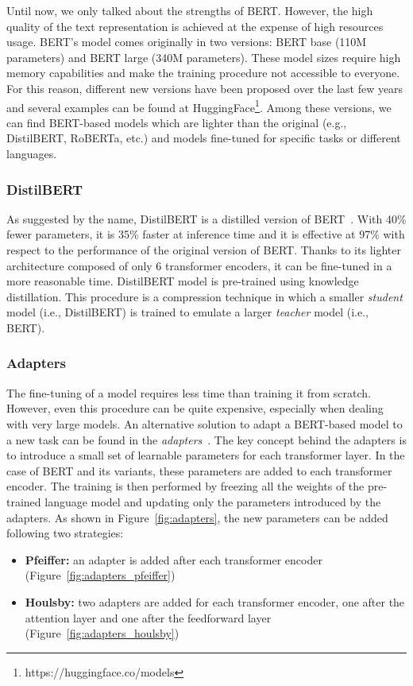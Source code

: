 Until now, we only talked about the strengths of BERT. However, the high quality of the text representation is achieved at the expense of high resources usage. BERT's model comes originally in two versions: BERT base (110M parameters) and BERT large (340M parameters). These model sizes require high memory capabilities and make the training procedure not accessible to everyone. For this reason, different new versions have been proposed over the last few years and several examples can be found at HuggingFace\footnote{https://huggingface.co/models}. Among these versions, we can find BERT-based models which are lighter than the original (e.g., DistilBERT, RoBERTa, etc.) and models fine-tuned for specific tasks or different languages.



\subsubsection{DistilBERT}
As suggested by the name, DistilBERT is a distilled version of BERT~\cite{distilbert}. With 40\% fewer parameters, it is 35\% faster at inference time and it is effective at 97\% with respect to the performance of the original version of BERT. Thanks to its lighter architecture composed of only 6 transformer encoders, it can be fine-tuned in a more reasonable time. DistilBERT model is pre-trained using knowledge distillation. This procedure is a compression technique in which a smaller \textit{student} model (i.e., DistilBERT) is trained to emulate a larger \textit{teacher} model (i.e., BERT).

\subsubsection{Adapters}
The fine-tuning of a model requires less time than training it from scratch. However, even this procedure can be quite expensive, especially when dealing with very large models. An alternative solution to adapt a BERT-based model to a new task can be found in the \textit{adapters}~\cite{pfeiffer-etal-2020-mad,pfeiffer2021adapterfusion}. The key concept behind the adapters is to introduce a small set of learnable parameters for each transformer layer. In the case of BERT and its variants, these parameters are added to each transformer encoder. The training is then performed by freezing all the weights of the pre-trained language model and updating only the parameters introduced by the adapters. As shown in Figure~\ref{fig:adapters}, the new parameters can be added following two strategies:
\begin{itemize}
    \item \textbf{Pfeiffer:} an adapter is added after each transformer encoder (Figure~\ref{fig:adapters_pfeiffer})
    \item \textbf{Houlsby:} two adapters are added for each transformer encoder, one after the attention layer and one after the feedforward layer (Figure~\ref{fig:adapters_houlsby})
\end{itemize}

